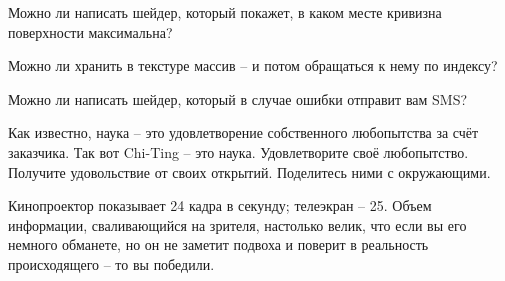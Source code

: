  Можно ли написать шейдер, который покажет, в каком
    месте кривизна поверхности максимальна?
  

 Можно ли хранить в текстуре массив – и потом
    обращаться к нему по индексу?
  

 Можно ли написать шейдер, который в случае ошибки
    отправит вам SMS?
  

 Как известно, наука – это удовлетворение
    собственного любопытства за счёт заказчика. Так вот Chi-Ting – это
    наука. Удовлетворите своё любопытство. Получите удовольствие от
    своих открытий. Поделитесь ними с окружающими.
  

 Кинопроектор показывает 24 кадра в секунду;
    телеэкран – 25. Объем информации, сваливающийся на зрителя,
    настолько велик, что если вы его немного обманете, но он не заметит
    подвоха и поверит в реальность происходящего – то вы
    победили.